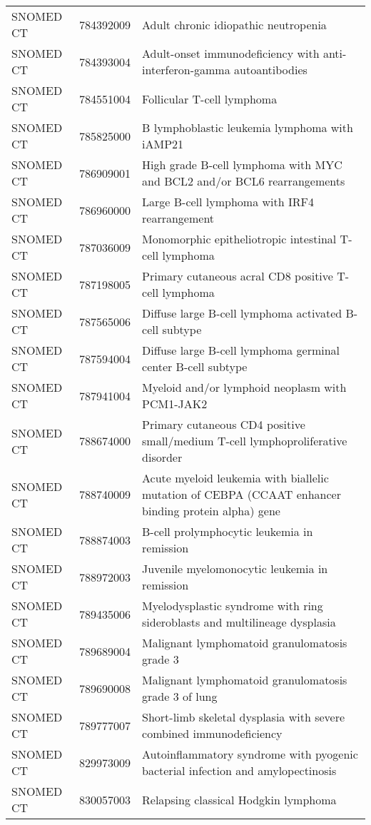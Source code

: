 \begin{longtable}{p{}p{}p{}}
  SNOMED CT & 784392009 & Adult chronic idiopathic neutropenia \\ 
  SNOMED CT & 784393004 & Adult-onset immunodeficiency with anti-interferon-gamma autoantibodies \\ 
  SNOMED CT & 784551004 & Follicular T-cell lymphoma \\ 
  SNOMED CT & 785825000 & B lymphoblastic leukemia lymphoma with iAMP21 \\ 
  SNOMED CT & 786909001 & High grade B-cell lymphoma with MYC and BCL2 and/or BCL6 rearrangements \\ 
  SNOMED CT & 786960000 & Large B-cell lymphoma with IRF4 rearrangement \\ 
  SNOMED CT & 787036009 & Monomorphic epitheliotropic intestinal T-cell lymphoma \\ 
  SNOMED CT & 787198005 & Primary cutaneous acral CD8 positive T-cell lymphoma \\ 
  SNOMED CT & 787565006 & Diffuse large B-cell lymphoma activated B-cell subtype \\ 
  SNOMED CT & 787594004 & Diffuse large B-cell lymphoma germinal center B-cell subtype \\ 
  SNOMED CT & 787941004 & Myeloid and/or lymphoid neoplasm with PCM1-JAK2 \\ 
  SNOMED CT & 788674000 & Primary cutaneous CD4 positive small/medium T-cell lymphoproliferative disorder \\ 
  SNOMED CT & 788740009 & Acute myeloid leukemia with biallelic mutation of CEBPA (CCAAT enhancer binding protein alpha) gene \\ 
  SNOMED CT & 788874003 & B-cell prolymphocytic leukemia in remission \\ 
  SNOMED CT & 788972003 & Juvenile myelomonocytic leukemia in remission \\ 
  SNOMED CT & 789435006 & Myelodysplastic syndrome with ring sideroblasts and multilineage dysplasia \\ 
  SNOMED CT & 789689004 & Malignant lymphomatoid granulomatosis grade 3 \\ 
  SNOMED CT & 789690008 & Malignant lymphomatoid granulomatosis grade 3 of lung \\ 
  SNOMED CT & 789777007 & Short-limb skeletal dysplasia with severe combined immunodeficiency \\ 
  SNOMED CT & 829973009 & Autoinflammatory syndrome with pyogenic bacterial infection and amylopectinosis \\ 
  SNOMED CT & 830057003 & Relapsing classical Hodgkin lymphoma \\ 

\end{longtable}
